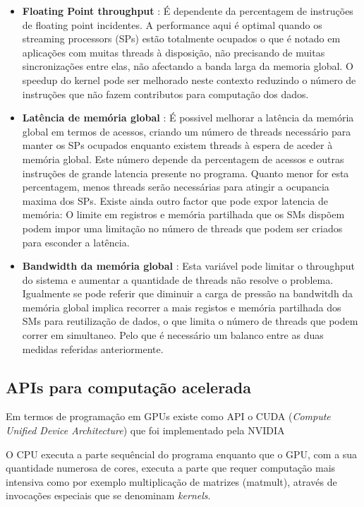 \begin{itemize}
\item{\textbf{Floating Point throughput}} : É dependente da percentagem de instruções de floating point incidentes. A performance aqui é optimal quando os streaming processors (SPs) estão totalmente ocupados o que é notado em aplicações com muitas threads à disposição, não precisando de muitas sincronizações entre elas, não afectando a banda larga da memoria global. O speedup do kernel pode ser melhorado neste contexto reduzindo o número de instruções que não fazem contributos para computação dos dados.

\item{\textbf{Latência de memória global}} : É possivel melhorar a latência da memória global em termos de acessos, criando um número de threads necessário para manter os SPs ocupados enquanto existem threads à espera de aceder à memória global. Este número depende da percentagem de acessos e outras instruções de grande latencia presente no programa. Quanto menor for esta percentagem, menos threads serão necessárias para atingir a ocupancia maxima dos SPs. Existe ainda outro factor que pode expor latencia de memória: O limite em registros e memória partilhada que os SMs dispõem podem impor uma limitação no número de threads que podem ser criados para esconder a latência.

\item{\textbf{Bandwidth da memória global}} : Esta variável pode limitar o throughput do sistema e aumentar a quantidade de threads não resolve o problema. Igualmente se pode referir que diminuir a carga de pressão na bandwitdh da memória global implica recorrer a mais registos e memória partilhada dos SMs para reutilização de dados, o que limita o número de threads que podem correr em simultaneo. Pelo que é necessário um balanco entre as duas medidas referidas anteriormente.
\end{itemize}

\subsection{APIs para computação acelerada}
\label {cuda}
Em termos de programação em GPUs existe como API o CUDA (\textit{Compute Unified Device Architecture}) que foi implementado pela NVIDIA 
 
 O CPU executa a parte sequêncial do programa enquanto que o GPU, com a sua quantidade numerosa de cores, executa a parte que requer computação mais intensiva como por exemplo multiplicação de matrizes (matmult), através de invocações especiais que se denominam\textit{ kernels}.\cite{nvidia2011nvidia}
  
